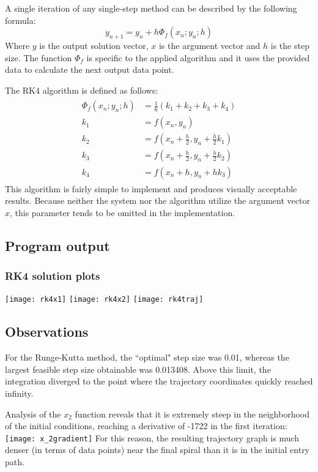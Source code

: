 \documentclass{article}
\begin{document}
	A single iteration of any single-step method can be described by the
	following formula:
	\begin{equation}
		y_{n + 1} = y_n + h\Phi_f(x_n; y_n; h)
	\end{equation}
	Where $y$ is the output solution vector, $x$ is the argument vector and
	$h$ is the step size. The function $\Phi_f$ is specific to the applied
	algorithm and it uses the provided data to calculate the next output
	data point.
	
	The RK4 algorithm is defined as follows:
	\begin{align}
		\begin{split}
			\Phi_f(x_n; y_n; h) &= \frac{1}{6}(k_1 + k_2 + k_3 + k_4)\\
			k_1 &= f(x_n, y_n)\\
			k_2 &= f(x_n + \frac{h}{2}, y_n + \frac{h}{2}k_1)\\
			k_3 &= f(x_n + \frac{h}{2}, y_n + \frac{h}{2}k_2)\\
			k_4 &= f(x_n + h, y_n + hk_3)
		\end{split}
	\end{align}
	This algorithm is fairly simple to implement and produces visually
	acceptable results. Because neither the system nor the algorithm utilize
	the argument vector $x$, this parameter tends to be omitted in the
	implementation.
	
	\subsection{Program output}
	
	\subsubsection{RK4 solution plots}
	\texttt{[image: rk4x1]}
	\texttt{[image: rk4x2]}
	\texttt{[image: rk4traj]}
	
	\newpage
	\subsection{Observations}
	
	For the Runge-Kutta method, the ``optimal" step size was 0.01, whereas
	the largest feasible step size obtainable was 0.013408. Above this
	limit, the integration diverged to the point where the trajectory
	coordinates quickly reached infinity.
	
	Analysis of the $x_2$ function reveals that it is extremely steep in the
	neighborhood of the initial conditions, reaching a derivative of -1722
	in the first iteration:
	\texttt{[image: x\_2gradient]}
	For this reason, the resulting trajectory graph is much denser (in terms
	of data points) near the final spiral than it is in the initial entry
	path.
	
\end{document}
